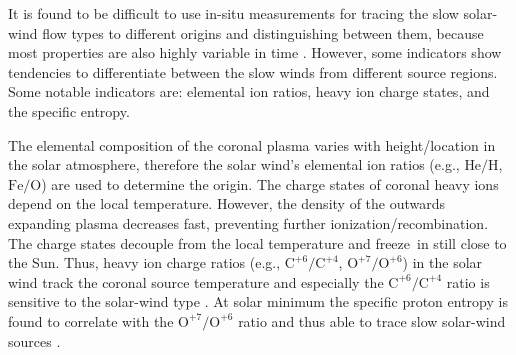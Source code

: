 It is found to be difficult to use in-situ measurements for tracing the slow solar-wind flow types to different origins and distinguishing between them, because most properties are also highly variable in time \citep{Kilpua2016}. However, some indicators show tendencies to differentiate between the slow winds from different source regions. Some notable indicators are: elemental ion ratios, heavy ion charge states, and the specific entropy.

The elemental composition of the coronal plasma varies with height/location in the solar atmosphere, therefore the solar wind's elemental ion ratios (e.g., $\text{He}/\text{H}$, $\text{Fe}/\text{O}$) are used to determine the origin.
The charge states of coronal heavy ions depend on the local temperature. However, the density of the outwards expanding plasma decreases fast, preventing further ionization/recombination. The charge states decouple from the local temperature and freeze~in still close to the Sun. Thus, heavy ion charge ratios (e.g., $\text{C}^{+6}\!/\text{C}^{+4}$, $\text{O}^{+7}\!/\text{O}^{+6}$) in the solar wind track the coronal source temperature and especially the $\text{C}^{+6}\!/\text{C}^{+4}$ ratio is sensitive to the solar-wind type \citep{Landi2012}.
At solar minimum the specific proton entropy is found to correlate with the $\text{O}^{+7}\!/\text{O}^{+6}$ ratio and thus able to trace slow solar-wind sources \citep{Pagel2004}.


